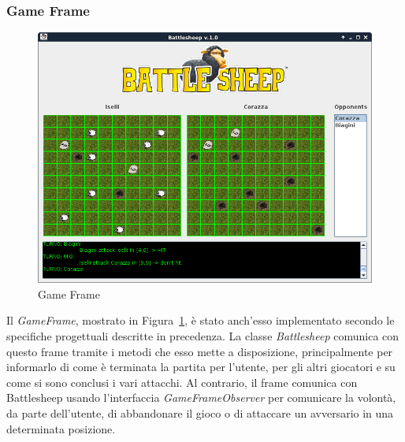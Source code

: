 \subsubsection{Game Frame}
\begin{figure}[!h]
	\centering
	\includegraphics[scale=0.4]{core/imgs/gui/game_frame}
	\caption{Game Frame}
	\label{figure:game_frame}
\end{figure}
Il \textit{GameFrame}, mostrato in Figura~\ref{figure:game_frame}, è stato anch'esso
 implementato secondo le specifiche progettuali descritte in precedenza.\newline
La classe \textit{Battlesheep} comunica con questo frame tramite i metodi che
esso mette a disposizione, principalmente per informarlo di come è terminata la
partita per l'utente, per gli altri giocatori e su come si sono conclusi i vari
attacchi. Al contrario, il frame comunica con Battlesheep usando l'interfaccia
\textit{GameFrameObserver} per comunicare la volontà, da parte dell'utente, di
abbandonare il gioco o di attaccare un avversario in una determinata posizione.
